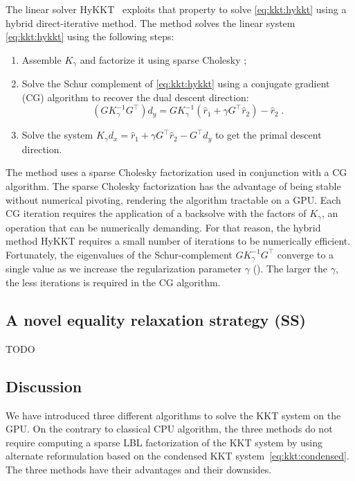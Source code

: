 The linear solver HyKKT~\cite{regev2023hykkt}
exploits that property to solve \eqref{eq:kkt:hykkt} using a hybrid
direct-iterative method. The method solves the linear system
\eqref{eq:kkt:hykkt} using the following steps:
\begin{enumerate}
  \item Assemble $K_\gamma$ and factorize it using sparse Cholesky ;
  \item Solve the Schur complement of \eqref{eq:kkt:hykkt} using a conjugate gradient (CG)
    algorithm to recover the dual descent direction:
    \begin{equation}
      \label{eq:kkt:schurcomplhykkt}
      (G K_\gamma^{-1} G^\top) d_y = G K_\gamma^{-1} (\hat{r}_1 + \gamma G^\top \hat{r}_2) - \hat{r}_2 \; .
    \end{equation}
  \item Solve the system $K_\gamma d_x = \hat{r}_1 + \gamma G^\top \hat{r}_2 - G^\top d_y$
    to get the primal descent direction.
\end{enumerate}
The method uses a sparse Cholesky factorization used in conjunction with a CG algorithm.
The sparse Cholesky factorization has the advantage of being stable without
numerical pivoting, rendering the algorithm tractable on a GPU.
Each CG iteration requires the application of a backsolve with the
factors of $K_\gamma$, an operation that can be numerically demanding. For that reason, the
hybrid method HyKKT requires a small number of iterations to be numerically efficient.
Fortunately, the eigenvalues of the Schur-complement $G K_\gamma^{-1} G^\top$
converge to a single value as we increase the regularization parameter
$\gamma$ (\cite[Theorem 4]{regev2023hykkt}). The larger the $\gamma$, the less iterations is required in the CG algorithm.


\subsection{A novel equality relaxation strategy (SS)}
\label{sec:kkt:sckkt}

TODO

\subsection{Discussion}
We have introduced three different algorithms to solve
the KKT system on the GPU. On the contrary to classical CPU algorithm,
the three methods do not require computing a sparse LBL factorization of the KKT
system by using alternate reformulation based on the condensed KKT
system~\eqref{eq:kkt:condensed}.
The three methods have their advantages and their downsides.

